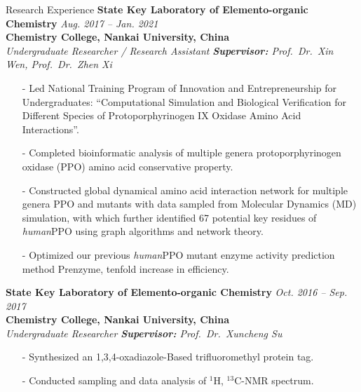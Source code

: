 \begin{rSection}{Research Experience}
    {\bf State Key Laboratory of Elemento-organic Chemistry} \hfill {\em Aug. 2017 -- Jan. 2021} 
    \\ {\bf Chemistry College, Nankai University, China}
    \\{\it Undergraduate Researcher / Research Assistant} \hfill {\textit{\textbf{Supervisor:} Prof.\ Dr.\ Xin Wen, Prof.\ Dr.\ Zhen Xi}}
    \begin{itemize}
        \item[-] Led National Training Program of Innovation and Entrepreneurship for Undergraduates: ``Computational Simulation and Biological Verification for Different Species of Protoporphyrinogen IX Oxidase Amino Acid Interactions''.
        \item[-] Completed bioinformatic analysis of multiple genera protoporphyrinogen oxidase (PPO) amino acid conservative property.
        \item[-] Constructed global dynamical amino acid interaction network for multiple genera PPO and mutants with data sampled from Molecular Dynamics (MD) simulation, with which further identified 67 potential key residues of \textit{human}PPO using graph algorithms and network theory.
        \item[-] Optimized our previous \textit{human}PPO mutant enzyme activity prediction method Prenzyme, tenfold increase in efficiency.
    \end{itemize}
    
    {\bf State Key Laboratory of Elemento-organic Chemistry} \hfill {\em Oct. 2016 -- Sep. 2017} 
    \\{\bf Chemistry College, Nankai University, China} 
    \\{\it Undergraduate Researcher} \hfill {\textit{\textbf{Supervisor:} Prof.\ Dr.\ Xuncheng Su}}
    \begin{itemize}
        \item[-] Synthesized an 1,3,4-oxadiazole-Based trifluoromethyl protein tag.
        \item[-] Conducted sampling and data analysis of $\mbox{}^1$H, $\mbox{}^{13}$C-NMR spectrum. 
    \end{itemize}
       
\end{rSection}